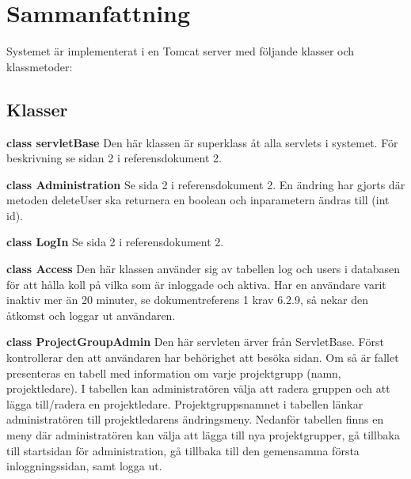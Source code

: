 \documentclass[a4paper]{article}
\begin{document}
\section{Sammanfattning}
Systemet är implementerat i en Tomcat server med följande klasser och klassmetoder:

\subsection{Klasser}
\begin{hangparas}{1.5em}{1}
\textbf{class servletBase} Den här klassen är superklass åt alla servlets i systemet. För beskrivning se sidan 2 i referensdokument 2.\end{hangparas} 

\vspace{5mm}
\begin{hangparas}{1.5em}{1}
\textbf{class Administration} Se sida 2 i referensdokument 2. En ändring har gjorts där metoden deleteUser ska returnera en boolean och inparametern ändras till (int id).\end{hangparas}

\vspace{5mm}
\begin{hangparas}{1.5em}{1}
\textbf{class LogIn} Se sida 2 i referensdokument 2.\end{hangparas}

\vspace{5mm}
\begin{hangparas}{1.5em}{1}
\textbf{class Access} Den här klassen använder sig av tabellen log och users i databasen för att hålla koll på vilka som är inloggade och aktiva. Har en användare varit inaktiv mer än 20 minuter, se dokumentreferens 1 krav 6.2.9, så nekar den åtkomst och loggar ut användaren. \end{hangparas}

\vspace{5mm}
\begin{hangparas}{1.5em}{1}
\textbf{class ProjectGroupAdmin} Den här servleten ärver från ServletBase. Först kontrollerar den att användaren har behörighet att besöka sidan. Om så är fallet presenteras en tabell med information om varje projektgrupp (namn, projektledare). I tabellen kan administratören välja att radera gruppen och att lägga till/radera en projektledare. Projektgruppsnamnet i tabellen länkar administratören till projektledarens ändringsmeny. Nedanför tabellen finns en meny där administratören kan välja att lägga till nya projektgrupper, gå tillbaka till startsidan för administration, gå tillbaka till den gemensamma första inloggningssidan, samt logga ut.\end{hangparas}
\end{document}
